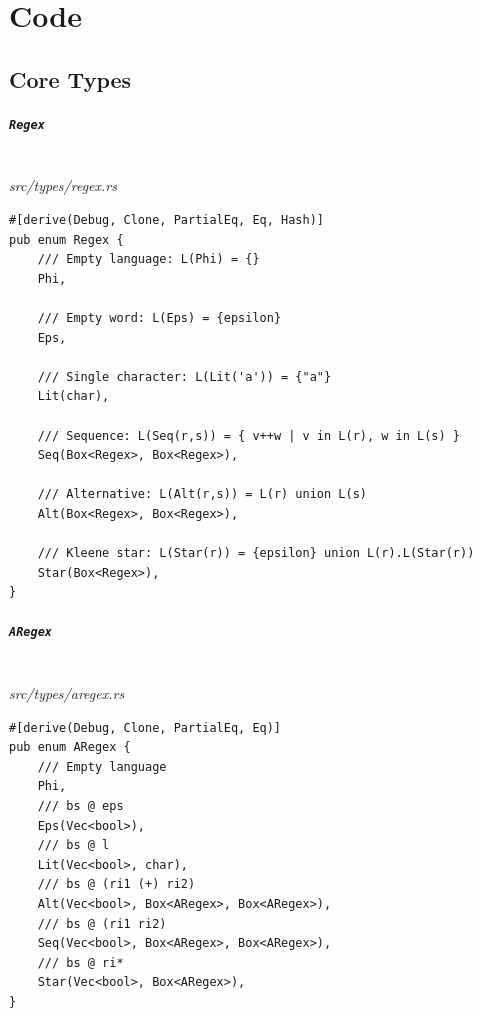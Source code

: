 \chapter{Code}
\label{app:code-listings}

\section{Core Types}
\label{app:code-types}

\paragraph{\texttt{Regex}}\ \\[-0.4em]
\textit{\small src/types/regex.rs}
{\scriptsize\begin{verbatim}
#[derive(Debug, Clone, PartialEq, Eq, Hash)]
pub enum Regex {
    /// Empty language: L(Phi) = {}
    Phi,

    /// Empty word: L(Eps) = {epsilon}
    Eps,

    /// Single character: L(Lit('a')) = {"a"}
    Lit(char),

    /// Sequence: L(Seq(r,s)) = { v++w | v in L(r), w in L(s) }
    Seq(Box<Regex>, Box<Regex>),

    /// Alternative: L(Alt(r,s)) = L(r) union L(s)
    Alt(Box<Regex>, Box<Regex>),
    
    /// Kleene star: L(Star(r)) = {epsilon} union L(r).L(Star(r))
    Star(Box<Regex>),
}
\end{verbatim}}

\paragraph{\texttt{ARegex}}\ \\[-0.4em]
\textit{\small src/types/aregex.rs}
{\scriptsize\begin{verbatim}
#[derive(Debug, Clone, PartialEq, Eq)]
pub enum ARegex {
    /// Empty language 
    Phi,
    /// bs @ eps
    Eps(Vec<bool>),
    /// bs @ l
    Lit(Vec<bool>, char),
    /// bs @ (ri1 (+) ri2)
    Alt(Vec<bool>, Box<ARegex>, Box<ARegex>),
    /// bs @ (ri1 ri2)
    Seq(Vec<bool>, Box<ARegex>, Box<ARegex>),
    /// bs @ ri*
    Star(Vec<bool>, Box<ARegex>),
}
\end{verbatim}}

